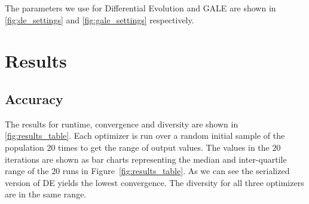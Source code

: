 \documentclass[conference]{IEEEtran}
\newcommand{\fig}[1]{Figure~\ref{fig:#1}}
\newcommand{\rowstyle}[1]{\gdef\currentrowstyle{#1}%
  #1\ignorespaces
}
\begin{document}
	The parameters we use for Differential Evolution and GALE are shown in \ref{fig:de_settings} and \ref{fig:gale_settings} respectively.
	
	\section{Results}
	\label{results}
	
	\begin{table}[htbp]
    \begin{minipage}{0.98\linewidth}
        \centering
        \caption{Runtimes of GALE and DE in seconds}
        \label{tab:runtimes}
    \end{minipage}
    \end{table}
	
	\subsection{Accuracy}
	The results for runtime, convergence and diversity are shown in \ref{fig:results_table}. Each optimizer is run over a random initial sample of the population 20 times to get the range of output values. The values in the 20 iterations are shown as bar charts representing the median and inter-quartile range of the 20 runs in \fig{results_table}.  As we can see the serialized version of DE yields the lowest convergence. The diversity for all three optimizers are in the same range.
	
\end{document}
